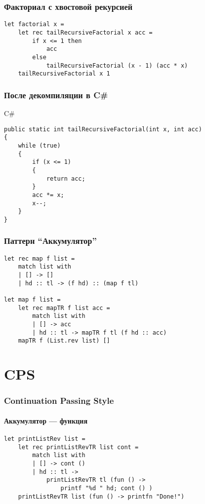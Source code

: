 \documentclass{../../slides-style}
\begin{document}
    \begin{frame}[fragile]
        \frametitle{Факториал с хвостовой рекурсией}
        \begin{verbatim}
let factorial x =
    let rec tailRecursiveFactorial x acc =
        if x <= 1 then
            acc
        else
            tailRecursiveFactorial (x - 1) (acc * x)
    tailRecursiveFactorial x 1
        \end{verbatim}
    \end{frame}
    
    \begin{frame}[fragile]
        \frametitle{После декомпиляции в C\#}
        \begin{alertblock}{C\#}
            \begin{verbatim}
public static int tailRecursiveFactorial(int x, int acc)
{
    while (true)
    {
        if (x <= 1)
        {
            return acc;
        }
        acc *= x;
        x--;
    }
}
            \end{verbatim}
        \end{alertblock}
    \end{frame}

    \begin{frame}[fragile]
        \frametitle{Паттерн ``Аккумулятор''}
        \begin{verbatim}
let rec map f list =
    match list with
    | [] -> []
    | hd :: tl -> (f hd) :: (map f tl)

let map f list =
    let rec mapTR f list acc =
        match list with
        | [] -> acc
        | hd :: tl -> mapTR f tl (f hd :: acc)
    mapTR f (List.rev list) []
        \end{verbatim}
    \end{frame}

    \section{CPS}

    \begin{frame}[fragile]
        \frametitle{Continuation Passing Style}
        \framesubtitle{Аккумулятор --- функция}
        \begin{verbatim}
let printListRev list =
    let rec printListRevTR list cont =
        match list with
        | [] -> cont ()
        | hd :: tl ->
            printListRevTR tl (fun () -> 
                printf "%d " hd; cont () )
    printListRevTR list (fun () -> printfn "Done!")
        \end{verbatim}
    \end{frame}
\end{document}
